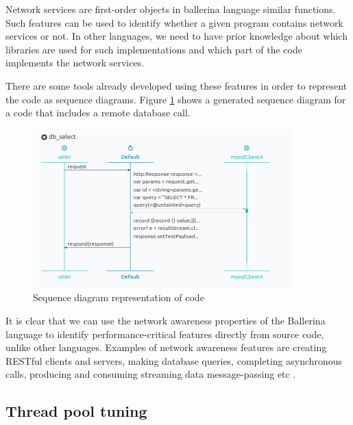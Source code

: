 Network services are first-order objects in ballerina language similar functions. \cite{ballerina_book} Such features
can be used to identify whether a given program contains network services or not. In other languages, we need to have prior knowledge about which libraries are used for such implementations and which part of the code implements the network services.


There are some tools already developed \cite{ballerina_plugin_vs_code,ballerina_plugin_intelij} using these features in order to represent the code as sequence diagrams. Figure \ref{diagram_view_ballerina_code} shows a generated sequence diagram for a code that includes a remote database call.

 \begin{figure}[htbp]
	\begin{center}
		\includegraphics[scale=0.7]{figures/diagram_view_db_call.png}
	\end{center}
	\caption{Sequence diagram representation of code}
	\label{diagram_view_ballerina_code}
\end{figure}
 
It is clear that we can use the network awareness properties of the Ballerina language to identify
performance-critical features directly from source code, unlike other languages. Examples of network
awareness features are creating RESTful clients and servers, making database queries, completing
asynchronous calls, producing and consuming streaming data message-passing etc \cite{ballerina_book}.

\subsection{Thread pool tuning}

